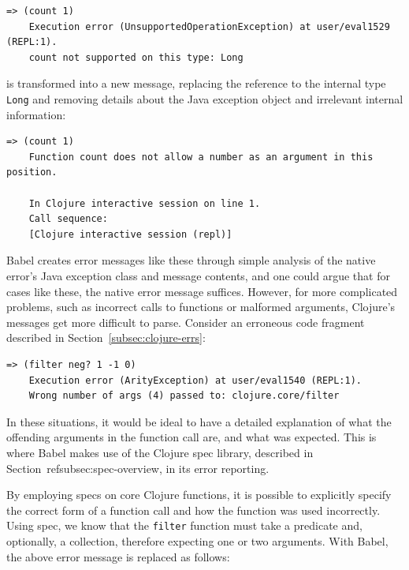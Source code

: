 \documentclass[12pt]{article}
\newcommand{\comment}[1]{}
\newcommand{\emcomment}[1]{\textcolor{ForestGreen}{\comment{Elena: {#1}}}}
\begin{document}
\begin{lstlisting}[breaklines=true, basicstyle=\ttfamily]
    => (count 1)
    Execution error (UnsupportedOperationException) at user/eval1529 (REPL:1).
    count not supported on this type: Long
\end{lstlisting}
    
is transformed into a new message, replacing the reference to the internal type \verb|Long| and removing details about the Java exception object and irrelevant internal information:

\begin{lstlisting}[breaklines=true, basicstyle=\ttfamily]
    => (count 1)
    Function count does not allow a number as an argument in this position.

    In Clojure interactive session on line 1.
    Call sequence:
    [Clojure interactive session (repl)]
\end{lstlisting}

Babel creates error messages like these through simple analysis of the native error's Java exception class and message contents, and one could argue that for cases like these, the native error message suffices. However, for more complicated problems, such as incorrect calls to functions or malformed arguments, Clojure's messages get more difficult to parse. Consider an erroneous code fragment described in Section~\ref{subsec:clojure-errs}: %

\begin{lstlisting}[breaklines=true, basicstyle=\ttfamily]
    => (filter neg? 1 -1 0)
    Execution error (ArityException) at user/eval1540 (REPL:1).
    Wrong number of args (4) passed to: clojure.core/filter
\end{lstlisting}

In these situations, it would be ideal to have a detailed explanation of what the offending arguments in the function call are, and what was expected. This is where Babel makes use of the Clojure spec library, described in Section~ref{subsec:spec-overview}, in its error reporting.

By employing specs on core Clojure functions, it is possible to explicitly specify the correct form of a function call and how the function was used incorrectly. Using spec, we know that the \verb|filter| function must take a predicate and, optionally, a collection, therefore expecting one or two arguments. With Babel, the above error message is replaced as follows:
\end{document}

